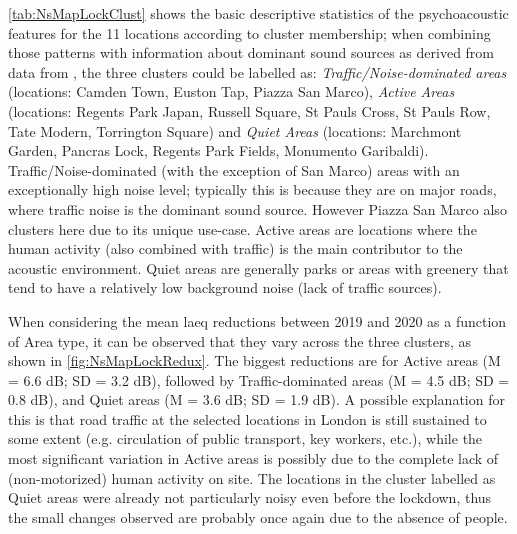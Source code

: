 \cref{tab:NsMapLockClust} shows the basic descriptive statistics of the psychoacoustic features for the 11 locations according to cluster membership; when combining those patterns with information about dominant sound sources as derived from data from \citet{Mitchell2020Soundscape}, the three clusters could be labelled as: \emph{Traffic/Noise-dominated areas} (locations: Camden Town, Euston Tap, Piazza San Marco), \emph{Active Areas} (locations: Regents Park Japan, Russell Square, St Pauls Cross, St Pauls Row, Tate Modern, Torrington Square) and \emph{Quiet Areas} (locations: Marchmont Garden, Pancras Lock, Regents Park Fields, Monumento Garibaldi). Traffic/Noise-dominated (with the exception of San Marco) areas with an exceptionally high noise level; typically this is because they are on major roads, where traffic noise is the dominant sound source. However Piazza San Marco also clusters here due to its unique use-case. Active areas are locations where the human activity (also combined with traffic) is the main contributor to the acoustic environment. Quiet areas are generally parks or areas with greenery that tend to have a relatively low background noise (lack of traffic sources).

When considering the mean \gls{laeq} reductions between 2019 and 2020 as a function of Area type, it can be observed that they vary across the three clusters, as shown in \cref{fig:NsMapLockRedux}. The biggest reductions are for Active areas (M = 6.6 dB; SD = 3.2 dB), followed by Traffic-dominated areas (M = 4.5 dB; SD = 0.8 dB), and Quiet areas (M = 3.6 dB; SD = 1.9 dB). A possible explanation for this is that road traffic at the selected locations in London is still sustained to some extent (e.g. circulation of public transport, key workers, etc.), while the most significant variation in Active areas is possibly due to the complete lack of (non-motorized) human activity on site. The locations in the cluster labelled as Quiet areas were already not particularly noisy even before the lockdown, thus the small changes observed are probably once again due to the absence of people.


